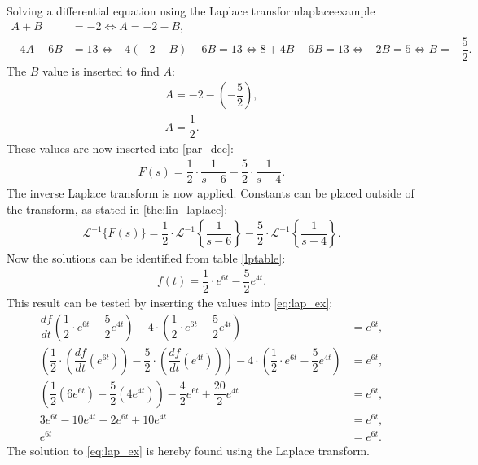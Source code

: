 \begin{example}{Solving a differential equation using the Laplace transform}{laplaceexample}
\begin{align*}
A+B &=-2 \Leftrightarrow A=-2-B, \\
-4A-6B &=13 \Leftrightarrow -4(-2-B)-6B = 13 \Leftrightarrow 8 + 4B - 6B = 13 \Leftrightarrow -2B = 5 \Leftrightarrow B = -\dfrac{5}{2}.
\end{align*}
The $B$ value is inserted to find $A$:
\begin{align*}
A=-2- \left(-\dfrac{5}{2} \right), \\
A=\dfrac{1}{2}.
\end{align*}
These values are now inserted into \eqref{par_dec}:
\begin{align*}
F(s) = \dfrac{1}{2} \cdot \dfrac{1}{s-6} - \dfrac{5}{2} \cdot \dfrac{1}{s-4}.
\end{align*}
The inverse Laplace transform is now applied. Constants can be placed outside of the transform, as stated in \cref{the:lin_laplace}:
\begin{align*}
\mathcal{L}^{-1} \big\{F(s) \big\} = \dfrac{1}{2} \cdot \mathcal{L}^{-1} \left\{\dfrac{1}{s-6} \right\} - \dfrac{5}{2} \cdot \mathcal{L}^{-1} \left\{\dfrac{1}{s-4} \right\}.
\end{align*}
Now the solutions can be identified from table \ref{lptable}:
\begin{align*}
f(t) = \dfrac{1}{2} \cdot e^{6t} - \dfrac{5}{2}e^{4t}.
\end{align*}
This result can be tested by inserting the values into \eqref{eq:lap_ex}:
\begin{align*}
\dfrac{df}{dt} \left(\dfrac{1}{2} \cdot e^{6t} - \dfrac{5}{2}e^{4t} \right) - 4 \cdot \left(\dfrac{1}{2} \cdot e^{6t} - \dfrac{5}{2}e^{4t} \right) &= e^{6t}, \\
\left(\dfrac{1}{2} \cdot \left(\dfrac{df}{dt} \left(e^{6t} \right) \right) - \dfrac{5}{2} \cdot \left(\dfrac{df}{dt} \left(e^{4t} \right) \right) \right) - 4 \cdot \left(\dfrac{1}{2} \cdot e^{6t} - \dfrac{5}{2} e^{4t} \right) &= e^{6t}, \\
\left(\dfrac{1}{2} \left(6e^{6t} \right) - \dfrac{5}{2} \left(4e^{4t} \right) \right) - \dfrac{4}{2}e^{6t}+\dfrac{20}{2}e^{4t}&= e^{6t},\\
3e^{6t}-10e^{4t}-2e^{6t}+10e^{4t} &= e^{6t}, \\
e^{6t} &= e^{6t}.
\end{align*}
The solution to \eqref{eq:lap_ex} is hereby found using the Laplace transform.
\end{example}